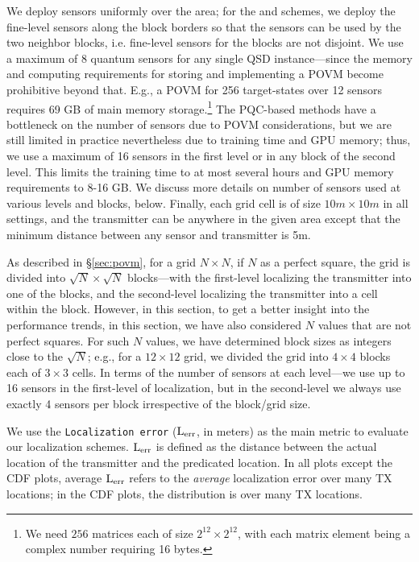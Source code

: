 We deploy sensors uniformly over the area; for the \povm and  \pqctwo schemes, we deploy the fine-level sensors along the block borders so that the sensors can be used by the two neighbor blocks, i.e. fine-level sensors for the blocks are not disjoint.
We use a maximum of 8 quantum sensors for any single QSD instance---since the memory and computing requirements for storing and implementing a POVM become prohibitive beyond that. E.g., a POVM for 256 target-states over 12 sensors requires 69 GB of main memory storage.\footnote{We need $256$ matrices each of size $2^{12} \times 2^{12}$, with each matrix element being a complex number requiring 16 bytes.} 
The PQC-based methods have a bottleneck on the number of sensors due to POVM considerations, but 
we are still limited in practice nevertheless due to training time and GPU memory; thus, we 
use a maximum of 16 sensors in the first level or in any block of the second level. This limits
the training time to at most several hours and GPU memory requirements to 8-16 GB. 
We discuss more details on number of sensors used at various levels and blocks, below.
Finally, each grid cell is of size $10m \times 10m$ in all settings, and the transmitter 
can be anywhere in the given area except that the minimum distance between any sensor
and transmitter is 5m.

As described in \S\ref{sec:povm}, for a grid $N \times N$, if $N$ as a perfect square, 
the grid is divided into $\sqrt{N} \times \sqrt{N}$ blocks---with the first-level localizing the transmitter into one of the blocks, and the second-level localizing
the transmitter into a cell within the block.
However, in this section, to get a better insight into the performance trends, in this section, we have also considered  $N$ values that are not perfect squares. 
For such $N$ values, we have determined block sizes as integers close to the $\sqrt{N}$; e.g., for a $12\times12$ grid, we divided the grid into $4 \times 4$ blocks each of $3 \times 3$ cells.
In terms of the number of sensors at each level---we use up to 16 sensors in the first-level of localization, but in the second-level we always use exactly 4 sensors per block irrespective of the block/grid size.

We use the {\tt Localization error} ($\mathrm{L_{err}}$, in meters) as the main metric to evaluate our localization schemes. $\mathrm{L_{err}}$ is defined as the distance between the actual location of the transmitter and the predicated location. 
In all plots except the CDF plots, average $\mathrm{L_{err}}$ refers to the
{\em average} localization error over many TX locations; 
in the CDF plots, the distribution is over many TX locations.

